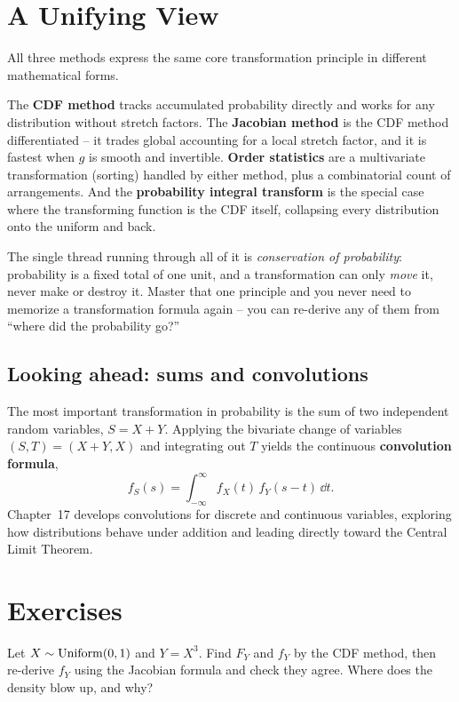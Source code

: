 \section{A Unifying View}
\label{ch16:unify}

\begin{aestheticbox}
All three methods express the same core transformation principle in different mathematical forms.

The \textbf{CDF method} tracks accumulated probability directly and works for any
distribution without stretch factors. The \textbf{Jacobian method} is the CDF method differentiated --
it trades global accounting for a local stretch factor, and it is fastest when $g$ is
smooth and invertible. \textbf{Order statistics} are a multivariate transformation
(sorting) handled by either method, plus a combinatorial count of arrangements. And the
\textbf{probability integral transform} is the special case where the transforming
function is the CDF itself, collapsing every distribution onto the uniform and back.

The single thread running through all of it is \emph{conservation of probability}:
probability is a fixed total of one unit, and a transformation can only \emph{move} it,
never make or destroy it. Master that one principle and you never need to memorize a
transformation formula again -- you can re-derive any of them from ``where did the
probability go?''
\end{aestheticbox}

\subsection*{Looking ahead: sums and convolutions}
The most important transformation in probability is the sum of two independent
random variables, $S = X + Y$. Applying the bivariate change of variables
$(S, T) = (X+Y, X)$ and integrating out $T$ yields the continuous \textbf{convolution formula},
\[
  f_S(s) = \int_{-\infty}^{\infty} f_X(t)\,f_Y(s-t)\,\dd t.
\]
Chapter~17 develops convolutions for discrete and continuous variables, exploring
how distributions behave under addition and leading directly toward the Central Limit Theorem.

\section*{Exercises}

\begin{exercise}
\label{ch16:ex-cube}
Let $X \sim \operatorname{Uniform}(0,1)$ and $Y = X^3$. Find $F_Y$ and $f_Y$ by the CDF method, then
re-derive $f_Y$ using the Jacobian formula and check they agree. Where does the density
blow up, and why?
\end{exercise}

